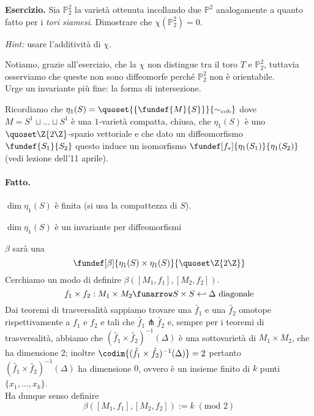 \noindent \textbf{Esercizio.}  Sia $\mathbb{P}_2^2$ la varietà ottenuta incollando due $\mathbb{P}^2$ analogamente a quanto fatto per i \emph{tori siamesi}. Dimostrare che $\chi(\mathbb{P}_2^2) = 0$.

\noindent \emph{Hint:} usare l'additività di $\chi$.

\begin{oss}
Notiamo, grazie all'esercizio, che la $\chi$ non distingue tra il toro $T$ e $\mathbb{P}_2^2$, tuttavia osserviamo che queste non sono diffeomorfe perché $\mathbb{P}_2^2$ non è orientabile. \\
Urge un invariante più fine: la forma di intersezione.
\end{oss}


Ricordiamo che $\eta_1(S) = \quoset{ \{ \fundef{M}{S} \} }{\sim_\text{cob}}$ dove $M = S^1 \sqcup \dots \sqcup S^1$ è una $1$-varietà compatta, chiusa, che $\eta_1(S)$ è uno $\quoset\Z{2\Z}$-spazio vettoriale e che dato un diffeomorfismo $\fundef{S_1}{S_2}$ questo induce un isomorfismo $\fundef[f_*]{\eta_1(S_1)}{\eta_1(S_2)}$ (vedi lezione dell'11 aprile).

\paragraph{Fatto.}  $\dim \eta_1(S)$ è finita (si usa la compattezza di $S$).

\begin{cor}
	$\dim \eta_1(S)$ è un invariante per diffeomorfismi
\end{cor}

\begin{defn} $\beta$ sarà una \[ \fundef[\beta]{\eta_1(S) \times \eta_1(S)}{\quoset\Z{2\Z}} \] Cerchiamo un modo di definire $\beta([M_1,f_1],[M_2,f_2])$.
\[ f_1 \times f_2: M_1 \times M_2 \funarrow S \times S \hookleftarrow \Delta \text{ diagonale} \]
Dai teoremi di trasversalità sappiamo trovare una $\tilde{f_1}$ e una $\tilde{f_2}$ omotope rispettivamente a $f_1$ e $f_2$ e tali che $\tilde{f_1} \pitchfork \tilde{f_2}$ e, sempre per i teoremi di trasversalità, abbiamo che $(\tilde{f_1} \times \tilde{f_2})^{-1}(\Delta)$ è una sottovarietà di $M_1 \times M_2$, che ha dimensione 2; inoltre $\codim{(\tilde{f_1} \times \tilde{f_2})^{-1}(\Delta)} = 2$ pertanto $(\tilde{f_1} \times \tilde{f_2})^{-1}(\Delta)$ ha dimensione $0$, ovvero è un insieme finito di $k$ punti $\{x_1, \dots , x_k \}$. \\
Ha dunque senso definire \[ \beta([M_1,f_1],[M_2,f_2]) := k \; (\text{mod } 2) \]
\end{defn}

